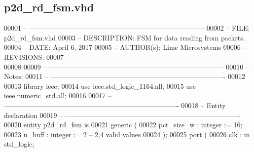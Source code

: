 \subsection{p2d\+\_\+rd\+\_\+fsm.\+vhd}
\label{p2d__rd__fsm_8vhd_source}

\begin{DoxyCode}
00001 \textcolor{keyword}{-- ---------------------------------------------------------------------------- }
00002 \textcolor{keyword}{-- FILE:    p2d\_rd\_fsm.vhd}
00003 \textcolor{keyword}{-- DESCRIPTION: FSM for data reading from packets.}
00004 \textcolor{keyword}{-- DATE:    April 6, 2017}
00005 \textcolor{keyword}{-- AUTHOR(s):   Lime Microsystems}
00006 \textcolor{keyword}{-- REVISIONS:}
00007 \textcolor{keyword}{-- ---------------------------------------------------------------------------- }
00008 
00009 \textcolor{keyword}{-- ----------------------------------------------------------------------------}
00010 \textcolor{keyword}{-- Notes:}
00011 \textcolor{keyword}{-- ----------------------------------------------------------------------------}
00012 
00013 \textcolor{vhdlkeyword}{library }\textcolor{keywordflow}{ieee};
00014 \textcolor{vhdlkeyword}{use }ieee.std\_logic\_1164.\textcolor{keywordflow}{all};
00015 \textcolor{vhdlkeyword}{use }ieee.numeric\_std.\textcolor{keywordflow}{all};
00016 
00017 \textcolor{keyword}{-- ----------------------------------------------------------------------------}
00018 \textcolor{keyword}{-- Entity declaration}
00019 \textcolor{keyword}{-- ----------------------------------------------------------------------------}
00020 \textcolor{keywordflow}{entity }p2d_rd_fsm \textcolor{keywordflow}{is}
00021    \textcolor{keywordflow}{generic} \textcolor{vhdlchar}{(}
00022       \textcolor{vhdlchar}{pct_size_w}           \textcolor{vhdlchar}{:} \textcolor{comment}{integer} \textcolor{vhdlchar}{:=} \textcolor{vhdllogic}{}\textcolor{vhdllogic}{16};
00023       \textcolor{vhdlchar}{n_buff}               \textcolor{vhdlchar}{:} \textcolor{comment}{integer} \textcolor{vhdlchar}{:=} \textcolor{vhdllogic}{}\textcolor{vhdllogic}{2}\textcolor{keyword}{ -- 2,4 valid values}
00024    \textcolor{vhdlchar}{)};
00025    \textcolor{keywordflow}{port} \textcolor{vhdlchar}{(}
00026       \textcolor{vhdlchar}{clk}                  \textcolor{vhdlchar}{:} \textcolor{keywordflow}{in} \textcolor{comment}{std\_logic};

\end{DoxyCode}
